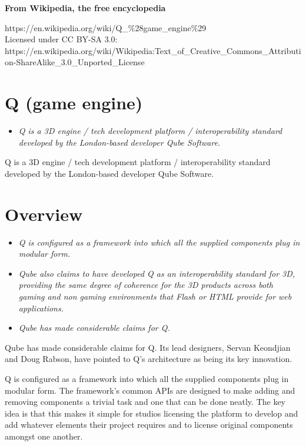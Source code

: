\textbf{From Wikipedia, the free encyclopedia}

https://en.wikipedia.org/wiki/Q\_\%28game\_engine\%29\\
Licensed under CC BY-SA 3.0:\\
https://en.wikipedia.org/wiki/Wikipedia:Text\_of\_Creative\_Commons\_Attribution-ShareAlike\_3.0\_Unported\_License

\section{Q (game engine)}\label{q-game-engine}

\begin{itemize}
\item
  \emph{Q is a 3D engine / tech development platform / interoperability
  standard developed by the London-based developer Qube Software.}
\end{itemize}

Q is a 3D engine / tech development platform / interoperability standard
developed by the London-based developer Qube Software.

\section{Overview}\label{overview}

\begin{itemize}
\item
  \emph{Q is configured as a framework into which all the supplied
  components plug in modular form.}
\item
  \emph{Qube also claims to have developed Q as an interoperability
  standard for 3D, providing the same degree of coherence for the 3D
  products across both gaming and non gaming environments that Flash or
  HTML provide for web applications.}
\item
  \emph{Qube has made considerable claims for Q.}
\end{itemize}

Qube has made considerable claims for Q. Its lead designers, Servan
Keondjian and Doug Rabson, have pointed to Q's architecture as being its
key innovation.

Q is configured as a framework into which all the supplied components
plug in modular form. The framework's common APIs are designed to make
adding and removing components a trivial task and one that can be done
neatly. The key idea is that this makes it simple for studios licensing
the platform to develop and add whatever elements their project requires
and to license original components amongst one another.

